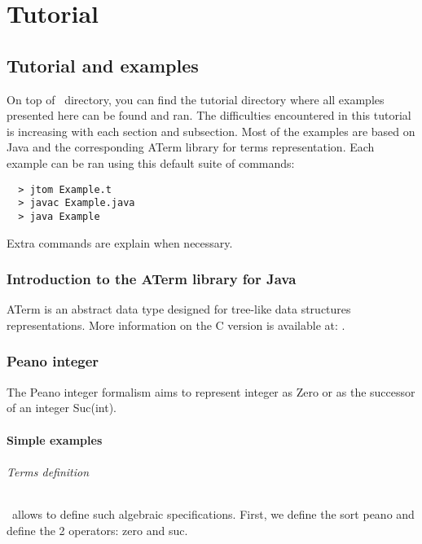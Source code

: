 \part{Tutorial}
\chapter{Tutorial and examples}

On top of \TOM\ directory, you can find the tutorial directory where
all examples presented here can be found and ran.
The difficulties encountered in this tutorial is increasing with each
section and subsection. Most of the examples are based on Java and the
corresponding ATerm library for terms representation.
Each example can be ran using this default suite of commands:
\begin{verbatim}
  > jtom Example.t
  > javac Example.java
  > java Example
\end{verbatim}

Extra commands are explain when necessary.

\section{Introduction to the ATerm library for Java}

ATerm is an abstract data type designed for tree-like data structures
representations.
More information on the C version is available at: 
.

\section{Peano integer}

The Peano integer formalism aims to represent integer as Zero or as the
successor of an integer Suc(int).

\subsection{Simple examples}
\paragraph{Terms definition}
\TOM\ allows to define such algebraic specifications. First, we define
the sort \textsf{peano} and define the 2 operators: \textsf{zero} and \textsf{suc}.


